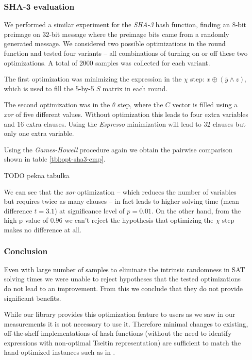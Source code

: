 \subsubsection{SHA-3 evaluation} 
We performed a similar experiment for the \emph{SHA-3} hash function, finding an $8$-bit preimage on $32$-bit message where the preimage bits came from a randomly generated message.
We considered two possible optimizations in the round function and tested four variants -- all combinations of turning on or off these two optimizations.
A total of $2000$ samples was collected for each variant.

The first optimization was minimizing the expression in the $\chi$ step: $x \oplus (\overline{y} \land z)$, which is used to fill the 5-by-5 $S$ matrix in each round.

The second optimization was in the $\theta$ step, where the $C$ vector is filled using a \emph{xor} of five different values.
Without optimization this leads to four extra variables and 16 extra clauses.
Using the \emph{Espresso} minimization will lead to 32 clauses but only one extra variable.

Using the \emph{Games-Howell} procedure again we obtain the pairwise comparison shown in table \ref{tbl:opt-sha3-cmp}.

TODO pekna tabulka

We can see that the \emph{xor} optimization -- which reduces the number of variables but requires twice as many clauses -- in fact leads to higher solving time (mean difference $t=3.1$) at significance level of $p=0.01$.
On the other hand, from the high p-value of $0.96$ we can't reject the hypothesis that optimizing the $\chi$ step makes no difference at all.

%

\subsubsection{Conclusion}
Even with large number of samples to eliminate the intrinsic randomness in SAT solving times we were unable to reject hypotheses that the tested optimizations do not lead to an improvement.
From this we conclude that they do not provide significant benefits.

While our library provides this optimization feature to users as we saw in our measurements it is not necessary to use it.
Therefore minimal changes to existing, off-the-shelf implementations of hash functions (without the need to identify expressions with non-optimal Tseitin representation) are sufficient to match the hand-optimized instances such as in \cite{nossum2012sat}.

